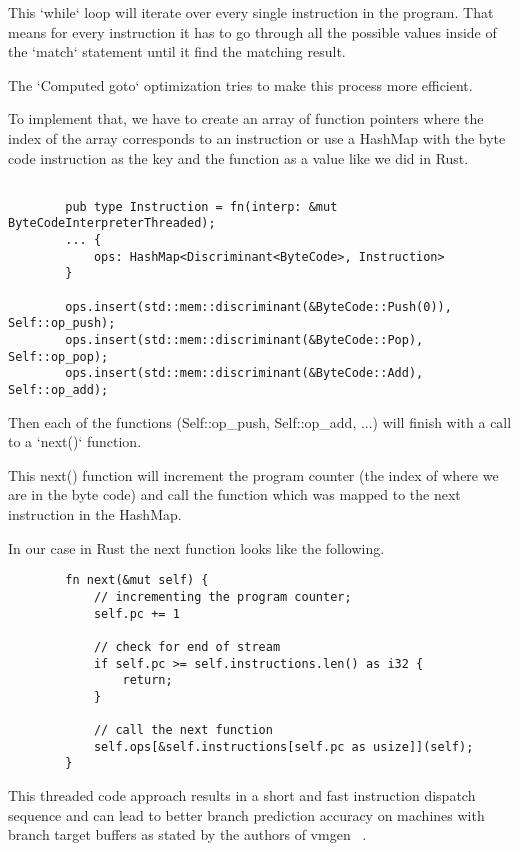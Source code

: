 \documentclass{article}
\begin{document}
\begin{enumerate}
        This `while` loop will iterate over every single instruction in the program. That means
        for every instruction it has to go through all the possible values inside of the `match`
        statement until it find the matching result.

        The `Computed goto` optimization tries to make this process more efficient.

        To implement that, we have to create an array of function pointers where
        the index of the array corresponds to an instruction or use a HashMap
        with the byte code instruction as the key and the function as a value
        like we did in Rust.

        \begin{verbatim}

        pub type Instruction = fn(interp: &mut ByteCodeInterpreterThreaded);
        ... {
            ops: HashMap<Discriminant<ByteCode>, Instruction>
        }

        ops.insert(std::mem::discriminant(&ByteCode::Push(0)), Self::op_push);
        ops.insert(std::mem::discriminant(&ByteCode::Pop), Self::op_pop);
        ops.insert(std::mem::discriminant(&ByteCode::Add), Self::op_add);
        \end{verbatim}

        Then each of the functions (Self::op\_push, Self::op\_add, ...) will finish
        with a call to a `next()` function.

        This next() function will increment the program counter (the index of
        where we are in the byte code) and call the function which was mapped
        to the next instruction in the HashMap.

        In our case in Rust the next function looks like the following.

        \begin{verbatim}
        fn next(&mut self) {
            // incrementing the program counter;
            self.pc += 1 

            // check for end of stream
            if self.pc >= self.instructions.len() as i32 {
                return; 
            }

            // call the next function
            self.ops[&self.instructions[self.pc as usize]](self);
        }
        \end{verbatim}

        This threaded code approach results in a short and fast instruction
        dispatch sequence and can lead to better branch prediction accuracy on
        machines with branch target buffers as stated by the authors of vmgen ~\cite{vmgen}.

\end{enumerate}
\end{document}
